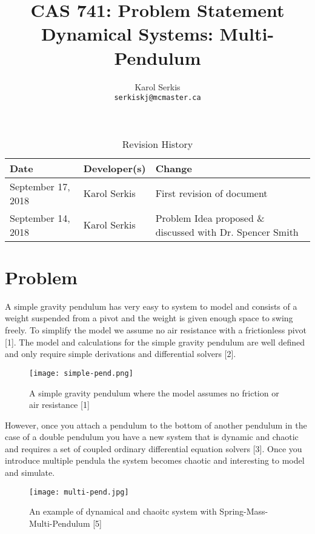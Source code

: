 \documentclass{article}
\title{CAS 741: Problem Statement\\[10pt]\Large Dynamical Systems: Multi-Pendulum }
\author{Karol Serkis\\\texttt{serkiskj@mcmaster.ca}}
\date{}
\begin{document}

\maketitle

\begin{table}[hp]
\caption{Revision History} \label{TblRevisionHistory}
\begin{tabularx}{\textwidth}{llX}
\toprule
\textbf{Date} & \textbf{Developer(s)} & \textbf{Change}\\
\midrule
September 17, 2018 & Karol Serkis & First revision of document\\

September 14, 2018 & Karol Serkis & Problem Idea proposed \& discussed with Dr. Spencer Smith \\
\bottomrule
\end{tabularx}
\end{table}

\section*{Problem}
A simple gravity pendulum has very easy to system to model and consists of a weight suspended from a pivot and the weight is given enough space to swing freely. To simplify the model we assume no air resistance with a frictionless pivot [1]. The model and calculations for the simple gravity pendulum are well defined and only require simple derivations and differential solvers [2].
\begin{figure}[H]
	\centering
	\texttt{[image: simple-pend.png]}
	\caption{A simple gravity pendulum where the model assumes no friction or air resistance [1]}
	\label{fig:maxresdefault}
\end{figure}

However, once you attach a pendulum to the bottom of another pendulum in the case of a double pendulum you have a new system that is dynamic and chaotic and requires a set of coupled ordinary differential equation solvers [3]. Once you introduce multiple pendula the system becomes chaotic and interesting to model and simulate.

\begin{figure}[H]
	\centering
	\texttt{[image: multi-pend.jpg]}
	\caption{An example of dynamical and chaoitc system with Spring-Mass-Multi-Pendulum [5]}
	\label{fig:maxresdefault}
\end{figure}
\end{document}
